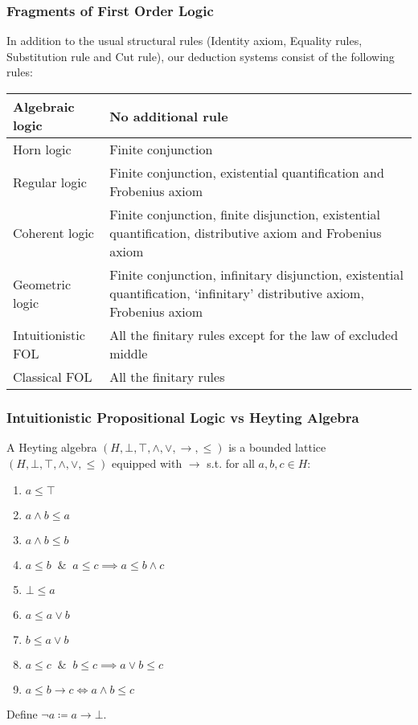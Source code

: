 \documentclass[UTF8,11pt,colorlinks,compress,openany]{beamer}%
\begin{document}
\begin{frame}\frametitle{Fragments of First Order Logic}
In addition to the usual structural rules (Identity axiom, Equality rules, Substitution rule and Cut rule), our deduction systems consist of the following rules:\\
\centering
\begin{tabu}{|p{.23\textwidth}|p{.67\textwidth}|}
\hline
	Algebraic logic &No additional rule\\
\hline
Horn logic &Finite conjunction\\
\hline
Regular logic &Finite conjunction, existential quantification and Frobenius axiom\\
\hline
	Coherent logic &Finite conjunction, finite disjunction, existential quantification, distributive axiom and Frobenius axiom\\
\hline
	Geometric logic &Finite conjunction, infinitary disjunction, existential quantification, `infinitary' distributive axiom, Frobenius axiom\\
\hline
Intuitionistic FOL &All the finitary rules except for the law of excluded middle\\
\hline
	Classical FOL &All the finitary rules\\
\hline
\end{tabu}
\end{frame}

\begin{frame}\frametitle{Intuitionistic Propositional Logic vs Heyting Algebra}
A Heyting algebra $(H,\bot,\top,\wedge,\vee,\to,\leq)$ is a bounded lattice $(H,\bot,\top,\wedge,\vee,\leq)$ equipped with $\to$ s.t. for all $a,b,c\in H$:
\begin{enumerate}
	\item $a\leq \top$
	\item $a\wedge b\leq a$
	\item $a\wedge b\leq b$
	\item $a\leq b\;\;\&\;\;a\leq c\implies a\leq b\wedge c$
	\item $\bot\leq a$
	\item $a\leq a\vee b$
	\item $b\leq a\vee b$
	\item $a\leq c\;\;\&\;\;b\leq c\implies a\vee b\leq c$
	\item $a\leq b\to c\iff a\wedge b\leq c$
\end{enumerate}
Define $\neg a\coloneqq a\to\bot$.
\end{frame}
\end{document}
